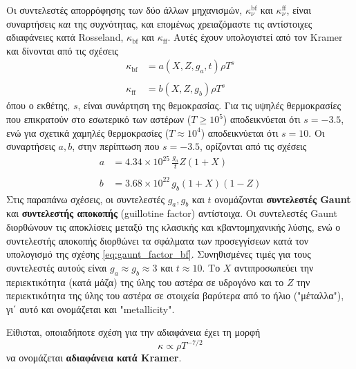 Οι συντελεστές απορρόφησης των δύο άλλων μηχανισμών, $\kappa_{\nu}^{\text{bf}}$ και $\kappa_{\nu}^{\text{ff}}$, είναι συναρτήσεις \textit{και} της συχνότητας, και επομένως χρειαζόμαστε τις αντίστοιχες αδιαφάνειες κατά Rosseland, $\kappa_{\text{bf}}$ και $\kappa_{\text{ff}}$. Αυτές έχουν υπολογιστεί από τον Kramer και δίνονται από τις σχέσεις
\begin{align}
    \kappa_{\text{bf}} &= a(X,Z,g_a,t) \rho T^s \label{eq:opacity_bound_free} \\ \nonumber \\
    \kappa_{\text{ff}} &= b(X,Z,g_b) \rho T^s \label{eq:opacity_free_free}
\end{align}
όπου ο εκθέτης, $s$, είναι συνάρτηση της θεμοκρασίας. Για τις υψηλές θερμοκρασίες που επικρατούν στο εσωτερικό των αστέρων ($T \geq 10^5$) αποδεικνύεται ότι $s = -3.5$, ενώ για σχετικά χαμηλές θερμοκρασίες ($T \approx 10^4$) αποδεικνύεται ότι $s = 10$. Οι συναρτήσεις $a, b$, στην περίπτωση που $s=-3.5$, ορίζονται από τις σχέσεις
\begin{align}
    a &= 4.34 \times 10^{25} \,\frac{g_a}{t} Z(1 + X) \label{eq:gaunt_factor_bf} \\ \nonumber \\
    b &= 3.68 \times 10^{22} \,g_b (1 + X) (1 - Z) \label{eq:gaunt_factor_ff}
\end{align}
Στις παραπάνω σχέσεις, οι συντελεστές $g_a, g_b$ και $t$ ονομάζονται \textbf{συντελεστές Gaunt} και \textbf{συντελεστής αποκοπής} (guillotine factor) αντίστοιχα. Οι συντελεστές Gaunt διορθώνουν τις αποκλίσεις μεταξύ της κλασικής και κβαντομηχανικής λύσης, ενώ ο συντελεστής αποκοπής διορθώνει τα σφάλματα των προσεγγίσεων κατά τον υπολογισμό της σχέσης \eqref{eq:gaunt_factor_bf}. Συνηθισμένες τιμές για τους συντελεστές αυτούς είναι $g_a \approx g_b \approx 3$ και $t \approx 10$. Το $X$ αντιπροσωπεύει την περιεκτικότητα (κατά μάζα) της ύλης του αστέρα σε υδρογόνο και το $Z$ την περιεκτικότητα της ύλης του αστέρα σε στοιχεία βαρύτερα από το ήλιο ("μέταλλα"), γι΄ αυτό και ονομάζεται και "metallicity".

Είθισται, οποιαδήποτε σχέση για την αδιαφάνεια έχει τη μορφή
\begin{equation}
    \label{eq:kramers_opacity_law_form}
    \kappa \propto \rho T^{-7/2}
\end{equation}
να ονομάζεται \textbf{αδιαφάνεια κατά Kramer}.

